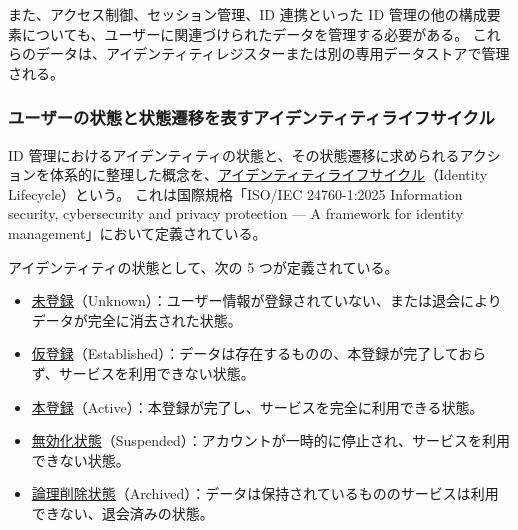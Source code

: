 \documentclass[uplatex]{jsarticle}
\def\label#1{}%
\begin{document}
また、アクセス制御、セッション管理、ID 連携といった ID 管理の他の構成要素についても、ユーザーに関連づけられたデータを管理する必要がある。
これらのデータは、アイデンティティレジスターまたは別の専用データストアで管理される。

\subsubsection{ユーザーの状態と状態遷移を表すアイデンティティライフサイクル}

\begin{dfn}[アイデンティティライフサイクル]\label{dfn:identity-lifecycle}
ID 管理におけるアイデンティティの状態と、その状態遷移に求められるアクションを体系的に整理した概念を、\underline{アイデンティティライフサイクル}（Identity Lifecycle）という。
これは国際規格「ISO/IEC 24760-1:2025 Information security, cybersecurity and privacy protection --- A framework for identity management」において定義されている。
\end{dfn}

\begin{dfn}[アイデンティティの状態]\label{dfn:ch3-identity-states}
アイデンティティの状態として、次の 5 つが定義されている。
\begin{itemize}
\item \underline{未登録}（Unknown）：ユーザー情報が登録されていない、または退会によりデータが完全に消去された状態。
\item \underline{仮登録}（Established）：データは存在するものの、本登録が完了しておらず、サービスを利用できない状態。
\item \underline{本登録}（Active）：本登録が完了し、サービスを完全に利用できる状態。
\item \underline{無効化状態}（Suspended）：アカウントが一時的に停止され、サービスを利用できない状態。
\item \underline{論理削除状態}（Archived）：データは保持されているもののサービスは利用できない、退会済みの状態。
\end{itemize}
\end{dfn}
\end{document}
